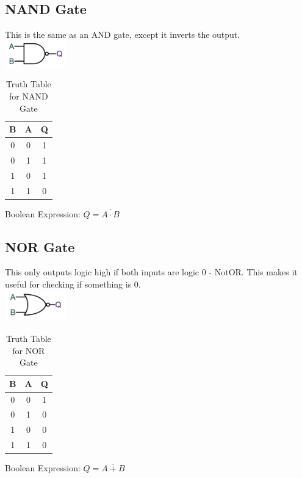 \documentclass[a4paper,11pt, twocolumn]{article}
\begin{document}
\subsection{NAND Gate}
This is the same as an AND gate, except it inverts the output.\\
\includegraphics[width=0.2\textwidth]{nandGate.PNG}\\
\begin{table}[H]
    \centering
    \begin{tabularx}{0.127\textwidth}{c|c|c}
    B & A & Q \\
    \hline
    0 & 0 & 1 \\
    0 & 1 & 1 \\
    1 & 0 & 1 \\
    1 & 1 & 0
    \end{tabularx}
    \caption{Truth Table for NAND Gate}
\end{table}
Boolean Expression: $Q = \overline{A \cdot B}$
\subsection{NOR Gate}
This only outputs logic high if both inputs are logic 0 - NotOR. This makes it useful for checking if something is 0.\\
\includegraphics[width=0.2\textwidth]{norGate.PNG}\\
\begin{table}[H]
    \centering
    \begin{tabularx}{0.127\textwidth}{c|c|c}
    B & A & Q \\
    \hline
    0 & 0 & 1 \\
    0 & 1 & 0 \\
    1 & 0 & 0 \\
    1 & 1 & 0
    \end{tabularx}
    \caption{Truth Table for NOR Gate}
\end{table}
Boolean Expression: $Q=\overline{A + B}$
\end{document}
